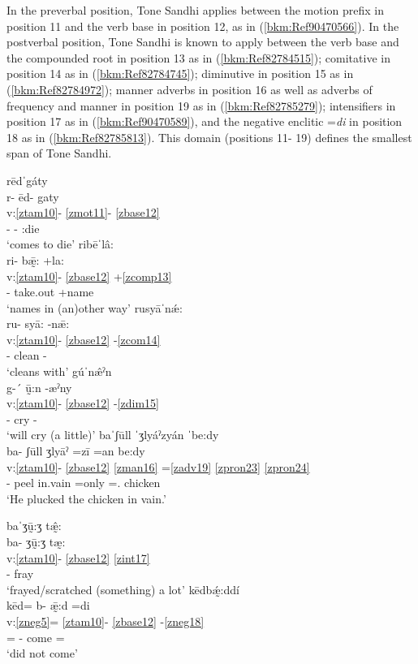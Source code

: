 \documentclass[output=paper]{langscibook}
\begin{document}
In the preverbal position, Tone Sandhi applies between the motion prefix in position 11 and the verb base in position 12, as in (\ref{bkm:Ref90470566}). In the postverbal position, Tone Sandhi is known to apply between the verb base and the compounded root in position 13 as in (\ref{bkm:Ref82784515}); comitative in position 14 as in (\ref{bkm:Ref82784745}); diminutive in position 15 as in (\ref{bkm:Ref82784972}); manner adverbs in position 16 as well as adverbs of frequency and manner in position 19 as in (\ref{bkm:Ref82785279}); intensifiers in position 17 as in (\ref{bkm:Ref90470589}), and the negative enclitic =\textit{di} in position 18 as in (\ref{bkm:Ref82785813}). This domain (positions 11{}- 19) defines the smallest span of Tone Sandhi.  

\ea\label{bkm:Ref90470566}
{rēdˈgáty}\\
\glll r- ēd- gaty\\
v:\ref{ztam10}- \ref{zmot11}- \ref{zbase12} \\
\Hab{}- \Ven{}- \Ven{}:die\\
\glt `comes to die'
\ex\label{bkm:Ref82784515}
{ribēˈlâ:}\\
\glll ri- b\={æ}̰: +la:\\
v:\ref{ztam10}- \ref{zbase12} +\ref{zcomp13} \\
\Hab{}- take.out +name\\
\glt `names in (an)other way'
\ex\label{bkm:Ref82784745}
{rusyāˈn\'{æ}:}\\
\glll ru- syā: {}-n\={æ}:\\
v:\ref{ztam10}- \ref{zbase12} {}-\ref{zcom14} \\
\Hab{}- clean -\Com{}\\
\glt  `cleans with'
\ex\label{bkm:Ref82784972}
{gúˈn\^{æ}ˀn}\\
\glll g-´ ṵ̄:n {}-æˀny\\
v:\ref{ztam10}- \ref{zbase12} {}-\ref{zdim15} \\
\Pot{}- cry -\Dim{}\\
\glt  `will cry (a little)'
\ex\label{bkm:Ref82785279}
{baˈʃūll ˈʒlyáˀzyán ˈbe:dy}\\
\glll ba- ʃūll ʒlyāˀ =zī =an be:dy\\
v:\ref{ztam10}- \ref{zbase12} \ref{zman16} =\ref{zadv19} \ref{zpron23} \ref{zpron24} \\
\Compl{}- peel in.vain =only =\Third\Sg{}.\Inf{} chicken\\
\glt  `He plucked the chicken in vain.'

\newpage
\ex\label{bkm:Ref90470589}
{baˈʒṵ̄:ʒ t\^{æ}̰:}\\
\glll ba- ʒṵ̄:ʒ tæ̰:\\
v:\ref{ztam10}- \ref{zbase12} \ref{zint17} \\
\Compl{}- fray \Intens{}\\
\glt  `frayed/scratched (something) a lot'
\ex\label{bkm:Ref82785813}
{kēdb\'{æ}̰:ddí}\\
\glll kēd= b- ǣ̰:d =di\\
v:\ref{zneg5}= \ref{ztam10}- \ref{zbase12} {}-\ref{zneg18} \\
\Neg{}= \Compl{}- come =\Neg{}\\
\glt  `did not come'
\z
\end{document}

